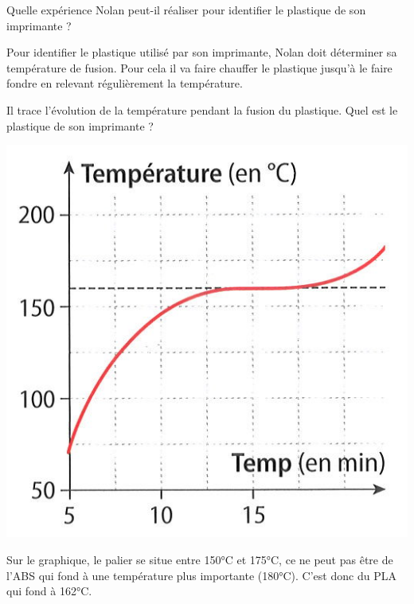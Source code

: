 \begin{questions}
	\question[2] Quelle expérience Nolan peut-il réaliser pour identifier le plastique de son imprimante ?
		\begin{solution}
			Pour identifier le plastique utilisé par son imprimante, Nolan doit déterminer sa température de fusion. Pour cela il va faire chauffer le plastique jusqu'à le faire fondre en relevant régulièrement la température.
		\end{solution}
	
	\question[2] Il trace l'évolution de la température pendant la fusion du plastique. Quel est le plastique de son imprimante ?
		\begin{center}
			\includegraphics[scale=0.45]{./img/courbe2}
		\end{center}

		\begin{solution}
			Sur le graphique, le palier se situe entre 150°C et 175°C, ce ne peut pas être de l'ABS qui fond à une température plus importante (180°C). C'est donc du PLA qui fond à 162°C.
		\end{solution}	

\end{questions}
